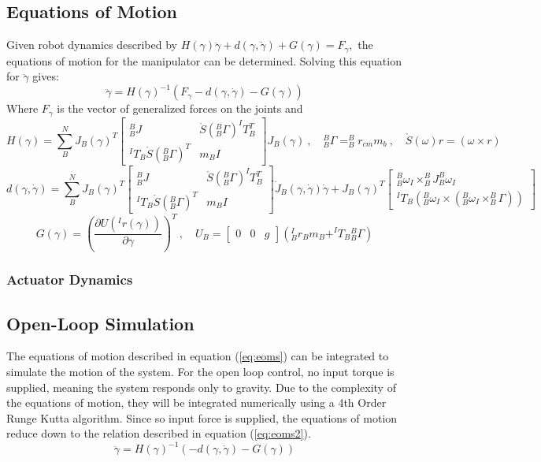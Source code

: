 \subsection{Equations of Motion}
Given robot dynamics described by \(H(\gamma) \ddot{\gamma}+d(\gamma, \dot{\gamma})+G(\gamma)=F_{\gamma},\) the equations of motion for
the manipulator can be determined. Solving this equation for \(\ddot{\gamma}\) gives:
\begin{equation}
  \ddot{\gamma}=H(\gamma)^{-1}\left(F_{\gamma}-d(\gamma, \dot{\gamma})-G(\gamma)\right)
  \label{eq:eoms}
\end{equation}
Where $F_{\gamma}$ is the vector of generalized forces on the joints and
\[
  \renewcommand{\arraystretch}{1.5}
  H(\gamma) = \sum_B^N J_B(\gamma)^T
  \begin{bmatrix}
    ^B_BJ & \mathring{S}(^B_B\Gamma) ^IT_B^T\\
    ^IT_B\mathring{S}(^B_B\Gamma)^T & m_BI
  \end{bmatrix}
  J_B(\gamma)~,\quad
  ^B_B\Gamma = ^B_Br_{cm}m_b~,\quad \mathring{S}(\omega)r=(\omega\times r)
\]
\[
  \renewcommand{\arraystretch}{1.5}
  d(\gamma,\dot{\gamma}) = \sum_B^N J_B(\gamma)^T
  \begin{bmatrix}
    ^B_BJ & \mathring{S}(^B_B\Gamma) ^IT_B^T\\
    ^IT_B\mathring{S}(^B_B\Gamma)^T & m_BI
  \end{bmatrix}
  \dot{J}_B(\gamma,\dot{\gamma})\dot{\gamma}+J_B(\gamma)^T
  \begin{bmatrix}
    ^B_B\omega_I \times ^B_BJ ^B_B\omega_I \\
    ^IT_B\left(^B_B\omega_I\times(^B_B\omega_I\times^B_B\Gamma)\right)
  \end{bmatrix}
\]
\[
G(\gamma) = \left(\frac{\partial U(^Ir(\gamma))}{\partial\gamma}\right)^T~,\quad U_B = \begin{bmatrix} 0 & 0 & g\end{bmatrix}\left(^I_Br_Bm_B + ^IT_B{}_B^B\Gamma\right)
\]
\subsubsection{Actuator Dynamics}


\subsection{Open-Loop Simulation}
The equations of motion described in equation (\ref{eq:eoms}) can be integrated to simulate the motion of the system. For the open loop control, no input torque is supplied, meaning the system responds only to gravity. Due to the complexity of the equations of motion, they will be integrated numerically using a 4th Order Runge Kutta algorithm. Since so input force is supplied, the equations of motion reduce down to the relation described in equation (\ref{eq:eoms2}).
\begin{equation}
\ddot{\gamma}=H(\gamma)^{-1}(-d(\gamma, \dot{\gamma})-G(\gamma))
\label{eq:eoms2}
\end{equation}


